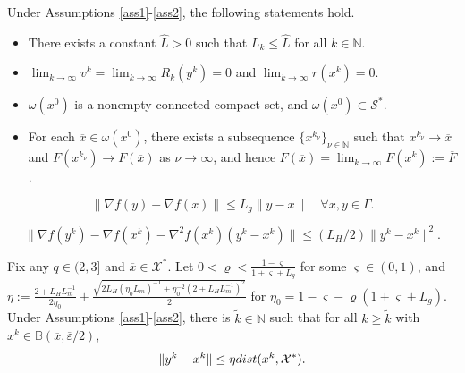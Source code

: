 \documentclass[10pt,a4paper]{amsart}
\begin{document}
\begin{proposition}\label{prop2-xk}  
 Under Assumptions \ref{ass1}-\ref{ass2}, the following statements hold.  
 \begin{itemize}	
 \item[(i)] There exists a constant $\widehat{L}>0$ such that $L_k\le\widehat{L}$ for all $k\in\mathbb{N}$.
		
 \item[(ii)] $\lim_{k\to\infty}v^k=\lim_{k\to\infty}R_k(y^k)=0$ and $\lim_{k\to\infty}r(x^k)=0$.
		
 \item[(iii)] $\omega(x^0)$ is a nonempty connected compact set, and $\omega(x^0)\subset\mathcal{S}^*$. 
 
 \item[(iv)] For each $\overline{x}\in\omega(x^0)$, there exists a subsequence $\{x^{k_{\nu}}\}_{\nu\in\mathbb{N}}$ such that $x^{k_{\nu}}\to\overline{x}$ and $F(x^{k_{\nu}})\to F(\overline{x})$ as $\nu\to\infty$, and hence $F(\overline{x})=\lim_{k\to\infty}F(x^k)\!:=\overline{F}$.
\end{itemize}
\end{proposition}

 \begin{equation}\label{grad-Lip}
  \|\nabla\!f(y)-\nabla\!f(x)\|\le L_{g}\|y-x\|\quad\forall x,y\in\Gamma.
 \end{equation}

 \begin{equation}\label{ineq-quad}
 \|\nabla\!f(y^k)-\nabla\!f(x^k)-\nabla^2\!f(x^k)(y^k\!-\!x^k)\|\le({L_H}/{2})\|y^k\!-\!x^k\|^{2}.
 \end{equation}  

\begin{proposition}\label{prop-dkbound1}
 Fix any $q\in\!(2,3]$ and $\overline{x}\in\!\mathcal{X}^*$. Let $0<\!\varrho<\!\frac{1-\varsigma}{1+\varsigma+L_g}$ for some $\varsigma\in(0,1)$, and $\eta\!:=\!\frac{2+L_HL_{m}^{-1}}{2\eta_0}\!+\!\frac{\sqrt{2L_H(\eta_0L_{m})^{-1}+\eta_0^{-2}(2+L_HL_{m}^{-1})^2}}{2}$ for $\eta_0\!=1-\!\varsigma\!-\!\varrho(1\!+\!\varsigma\!+\!L_g)$. Under Assumptions \ref{ass1}-\ref{ass2}, 
 there is $\widetilde{k}\in\!\mathbb{N}$ such that for all $k\ge\widetilde{k}$ with $x^k\!\in\mathbb{B}(\overline{x},{\overline{\varepsilon}}/{2})$,
 \begin{equation}\label{ykxk-bound}
   \|y^k-x^k\|\le \eta{\rm dist}(x^k,\mathcal{X}^*).
 \end{equation}
\end{proposition}
\end{document}
